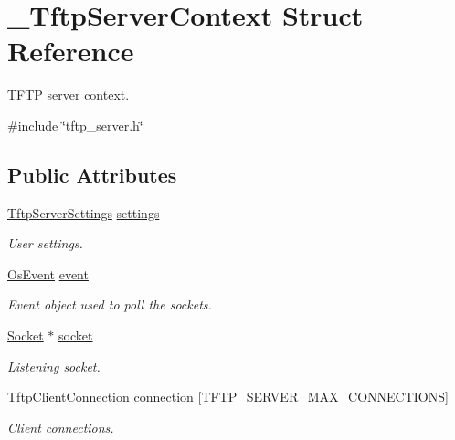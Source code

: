 \hypertarget{struct__TftpServerContext}{}\section{\+\_\+\+Tftp\+Server\+Context Struct Reference}
\label{struct__TftpServerContext}


T\+F\+TP server context.  




{\ttfamily \#include \char`\"{}tftp\+\_\+server.\+h\char`\"{}}

\subsection*{Public Attributes}
\begin{DoxyCompactItemize}
\item 
\hyperlink{structTftpServerSettings}{Tftp\+Server\+Settings} \hyperlink{struct__TftpServerContext_adaf2a9a72bc906e3d18fa724566555b6}{settings}
\begin{DoxyCompactList}\small\item\em User settings. \end{DoxyCompactList}\item 
\hyperlink{structOsEvent}{Os\+Event} \hyperlink{struct__TftpServerContext_af350a1fe0c7afb61743cdbf397f2e4d5}{event}
\begin{DoxyCompactList}\small\item\em Event object used to poll the sockets. \end{DoxyCompactList}\item 
\hyperlink{socket_8h_aa85acfb0fa336ef495e6ba87fb88fc48}{Socket} $\ast$ \hyperlink{struct__TftpServerContext_a22ca610eecff8811985a003459e9c055}{socket}
\begin{DoxyCompactList}\small\item\em Listening socket. \end{DoxyCompactList}\item 
\hyperlink{tftp__server_8h_a0f645438c1de49e8bfc6960ef861e5c9}{Tftp\+Client\+Connection} \hyperlink{struct__TftpServerContext_a2af7d1036f98983f53ecd9ac32a38f01}{connection} \mbox{[}\hyperlink{tftp__server_8h_a0acdd308af5bdb354e7a80dc8ff4388d}{T\+F\+T\+P\+\_\+\+S\+E\+R\+V\+E\+R\+\_\+\+M\+A\+X\+\_\+\+C\+O\+N\+N\+E\+C\+T\+I\+O\+NS}\mbox{]}
\begin{DoxyCompactList}\small\item\em Client connections. \end{DoxyCompactList}\item 

\end{DoxyCompactItemize}
